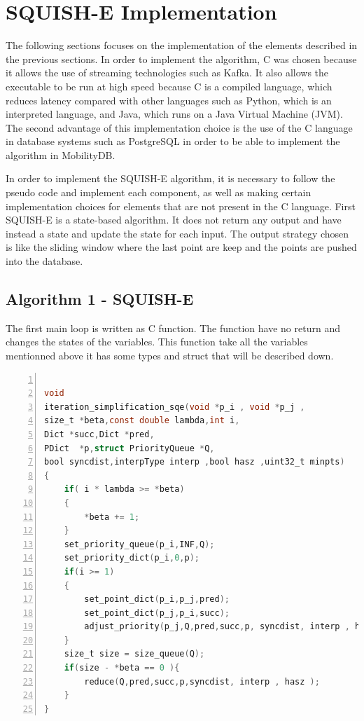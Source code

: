 

\section{SQUISH-E Implementation}
The following sections focuses on the implementation of the elements described in the previous sections. In order to implement the algorithm, C was chosen because it allows the use of streaming technologies such as Kafka. It also allows the executable to be run at high speed because C is a compiled language, which reduces latency compared with other languages such as Python, which is an interpreted language, and Java, which runs on a Java Virtual Machine (JVM). The second advantage of this implementation choice is the use of the C language in database systems such as PostgreSQL in order to be able to implement the algorithm in MobilityDB.

In order to implement the SQUISH-E algorithm, it is necessary to follow the pseudo code and implement each component, as well as making certain implementation choices for elements that are not present in the C language. First SQUISH-E is a state-based algorithm. It does not return any output and have instead a state and update the state for each input. The output strategy chosen is like the sliding window where the last point are keep and the points are pushed into the database. 

\subsection{Algorithm 1 - SQUISH-E}

The first main loop is written as C function. The function have no return and changes the states of the variables.  This function take all the variables mentionned above it has some types and struct that will be described down. 

\begin{lstlisting}[float=h,language=C, % Spécifie le langage du code
caption={SQUISH-E}, % Légende du listing
label=lst:squish_c, % Étiquette pour référencer le listing
numbers=left,
numberstyle=\tiny\color{gray},
stepnumber=1,
frame=single,
breaklines=true,
postbreak=\mbox{\textcolor{red}{$\hookrightarrow$}\space},
showstringspaces=false
]

void
iteration_simplification_sqe(void *p_i , void *p_j ,
size_t *beta,const double lambda,int i,
Dict *succ,Dict *pred,
PDict  *p,struct PriorityQueue *Q,
bool syncdist,interpType interp ,bool hasz ,uint32_t minpts)
{
	if( i * lambda >= *beta)
	{
		*beta += 1;
	}
	set_priority_queue(p_i,INF,Q);
	set_priority_dict(p_i,0,p);
	if(i >= 1)
	{
		set_point_dict(p_i,p_j,pred);
		set_point_dict(p_j,p_i,succ);
		adjust_priority(p_j,Q,pred,succ,p, syncdist, interp , hasz );
	}
	size_t size = size_queue(Q);
	if(size - *beta == 0 ){
		reduce(Q,pred,succ,p,syncdist, interp , hasz );
	}
}
\end{lstlisting}


